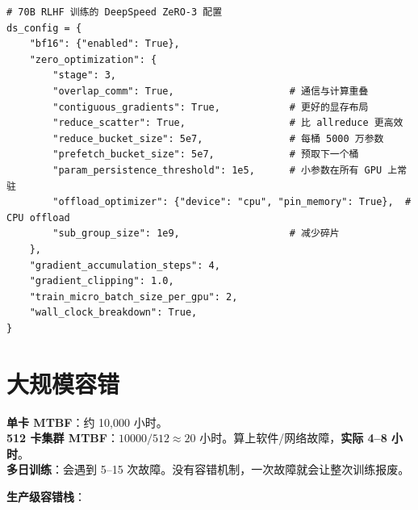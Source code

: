 \begin{lstlisting}[style=pythonstyle]
# 70B RLHF 训练的 DeepSpeed ZeRO-3 配置
ds_config = {
    "bf16": {"enabled": True},
    "zero_optimization": {
        "stage": 3,
        "overlap_comm": True,                    # 通信与计算重叠
        "contiguous_gradients": True,            # 更好的显存布局
        "reduce_scatter": True,                  # 比 allreduce 更高效
        "reduce_bucket_size": 5e7,               # 每桶 5000 万参数
        "prefetch_bucket_size": 5e7,             # 预取下一个桶
        "param_persistence_threshold": 1e5,      # 小参数在所有 GPU 上常驻
        "offload_optimizer": {"device": "cpu", "pin_memory": True},  # CPU offload
        "sub_group_size": 1e9,                   # 减少碎片
    },
    "gradient_accumulation_steps": 4,
    "gradient_clipping": 1.0,
    "train_micro_batch_size_per_gpu": 2,
    "wall_clock_breakdown": True,
}
\end{lstlisting}

\section{大规模容错}
\label{fault-tolerance-at-scale}

\begin{warningbox}[硬件故障现实]
\textbf{单卡 MTBF}：约 10,000 小时。\\
\textbf{512 卡集群 MTBF}：$10000/512 \approx 20$ 小时。算上软件/网络故障，\textbf{实际 4--8 小时}。\\
\textbf{多日训练}：会遇到 5--15 次故障。没有容错机制，一次故障就会让整次训练报废。
\end{warningbox}

\textbf{生产级容错栈}：


